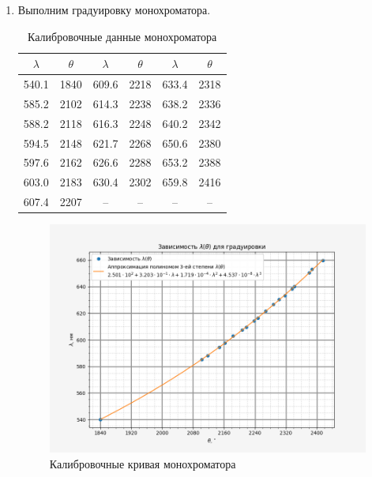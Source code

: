     \begin{enumerate}
        \item Выполним градуировку монохроматора.
        \begin{table}[H]
            \centering
            \begin{tabular}{|c|c|c|c|c|c|}
                \hline
                $\lambda$ & $\theta$ & $\lambda$ & $\theta$ & $\lambda$ & $\theta$ \\ \hline
                540.1     & 1840     & 609.6     & 2218     & 633.4     & 2318     \\ \hline
                585.2     & 2102     & 614.3     & 2238     & 638.2     & 2336     \\ \hline
                588.2     & 2118     & 616.3     & 2248     & 640.2     & 2342     \\ \hline
                594.5     & 2148     & 621.7     & 2268     & 650.6     & 2380     \\ \hline
                597.6     & 2162     & 626.6     & 2288     & 653.2     & 2388     \\ \hline
                603.0     & 2183     & 630.4     & 2302     & 659.8     & 2416     \\ \hline
                607.4     & 2207     & --        & --       & --        & --       \\ \hline
                \end{tabular}
            \caption{Калибровочные данные монохроматора}
        \end{table}

        \begin{figure}[H]
            \centering
            \includegraphics[width = 14.5 cm]{images/calibration}
            \caption{Калибровочные кривая монохроматора}
            \label{calibr}
        \end{figure}


\end{enumerate}
